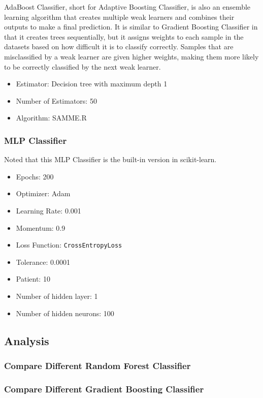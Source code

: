 \documentclass[twocolumn]{extarticle}
\begin{document}
AdaBoost Classifier, short for Adaptive Boosting Classifier, is also an ensemble learning algorithm that creates multiple weak learners and combines their outputs to make a final prediction. It is similar to Gradient Boosting Classifier in that it creates trees sequentially, but it assigns weights to each sample in the datasets based on how difficult it is to classify correctly. Samples that are misclassified by a weak learner are given higher weights, making them more likely to be correctly classified by the next weak learner.

\begin{itemize}
\item Estimator: Decision tree with maximum depth 1
\item Number of Estimators: 50
\item Algorithm: SAMME.R
\end{itemize}

\subsubsection{MLP Classifier}

Noted that this MLP Classifier is the built-in version in scikit-learn.

\begin{itemize}
\item Epochs: 200
\item Optimizer: Adam
\item Learning Rate: 0.001
\item Momentum: 0.9
\item Loss Function: \texttt{CrossEntropyLoss}
\item Tolerance: 0.0001
\item Patient: 10
\item Number of hidden layer: 1
\item Number of hidden neurons: 100
\end{itemize}

\subsection{Analysis}

\subsubsection{Compare Different Random Forest Classifier}
\subsubsection{Compare Different Gradient Boosting Classifier}
\end{document}
